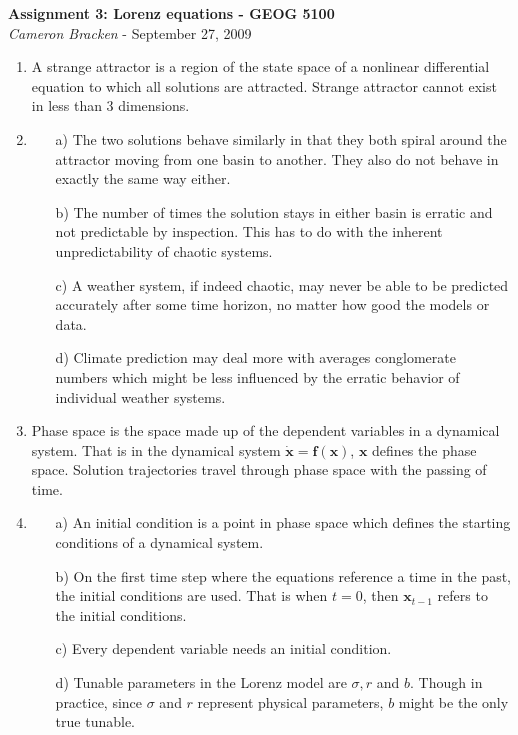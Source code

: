 \documentclass[11pt,oneside]{article}
\begin{document}
\begin{center}
	\textbf{Assignment 3: Lorenz equations - GEOG 5100}\\
	{\itshape Cameron Bracken} - September 27, 2009
\end{center}


\begin{enumerate}
\item A strange attractor is a region of the state space of a nonlinear differential equation to which all solutions are attracted.  Strange attractor cannot exist in less than 3 dimensions.  

\item 
\begin{enumerate}
	\item[a)] The two solutions behave similarly in that they both spiral around the attractor moving from one basin to another.  They also do not behave in exactly the same way either.  
	\item[b)] The number of times the solution stays in either basin is erratic and not predictable by inspection. This has to do with the inherent unpredictability of chaotic systems.
	\item[c)] A weather system, if indeed chaotic, may never be able to be predicted accurately after some time horizon, no matter how good the models or data. 
	\item[d)] Climate prediction may deal more with averages conglomerate numbers which might be less influenced by the erratic behavior of individual weather systems. 
\end{enumerate}

\item Phase space is the space made up of the dependent variables in a dynamical system.  That is in the dynamical system $\mathbf{\dot{x}} = \mathbf{f}(\mathbf{x})$, $\mathbf{x}$ defines the phase space. Solution trajectories travel through phase space with the passing of time. 

\item 
\begin{enumerate}
	\item[a)] An initial condition is a point in phase space which defines the starting conditions of a dynamical system. 
	\item[b)] On the first time step where the equations reference a time in the past, the initial conditions are used.  That is when $t=0$, then $\mathbf{x}_{t-1}$ refers to the initial conditions. 
	\item[c)] Every dependent variable needs an initial condition. 
	\item[d)] Tunable parameters in the Lorenz model are $\sigma, r$ and $b$.  Though in practice, since $\sigma$ and $r$ represent physical parameters, $b$ might be the only true tunable. 
\end{enumerate}


\end{enumerate}
\end{document}
